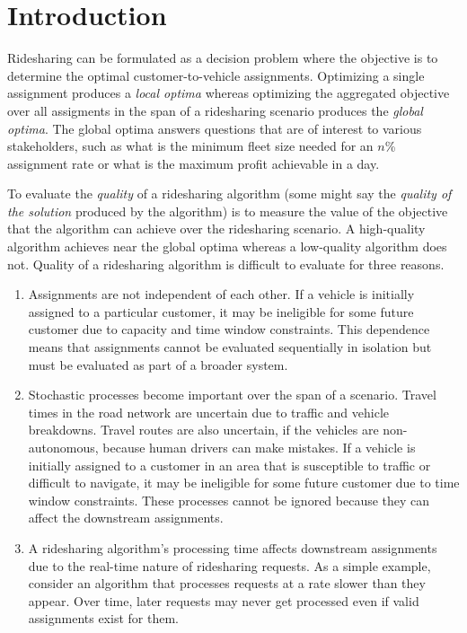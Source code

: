 \nwenddocs{}\chapter{Introduction}
\label{intro}

\renewcommand{\thepage}{\arabic{page}}
\setcounter{page}{1}

Ridesharing can be formulated as a decision problem where the objective is to
determine the optimal customer-to-vehicle assignments. Optimizing a single
assignment produces a \emph{local optima} whereas optimizing the aggregated
objective over all assigments in the span of a ridesharing scenario produces
the \emph{global optima}. The global optima answers questions that are of
interest to various stakeholders, such as what is the minimum fleet size needed
for an $n$\% assignment rate or what is the maximum profit achievable in a day.

To evaluate the \emph{quality} of a ridesharing algorithm (some might say the
\emph{quality of the solution} produced by the algorithm) is to measure the
value of the objective that the algorithm can achieve over the ridesharing
scenario. A high-quality algorithm achieves near the global optima whereas a
low-quality algorithm does not. Quality of a ridesharing algorithm is difficult
to evaluate for three reasons.
\begin{enumerate}
\item {} Assignments are not independent of each
other. If a vehicle is initially assigned to a particular customer, it may be
ineligible for some future customer due to capacity and time window
constraints. This dependence means that assignments cannot be evaluated
sequentially in isolation but must be evaluated as part of a broader system.
\item {} Stochastic processes become important over the
span of a scenario.  Travel times in the road network are uncertain due to
traffic and vehicle breakdowns. Travel routes are also uncertain, if the
vehicles are non-autonomous, because human drivers can make mistakes.  If a
vehicle is initially assigned to a customer in an area that is susceptible to
traffic or difficult to navigate, it may be ineligible for some future customer
due to time window constraints. These processes cannot be ignored because they
can affect the downstream assignments.
\item {} A ridesharing algorithm's processing time
affects downstream assignments due to the real-time nature of ridesharing
requests. As a simple example, consider an algorithm that processes requests at
a rate slower than they appear. Over time, later requests may never get
processed even if valid assignments exist for them.
\end{enumerate}

